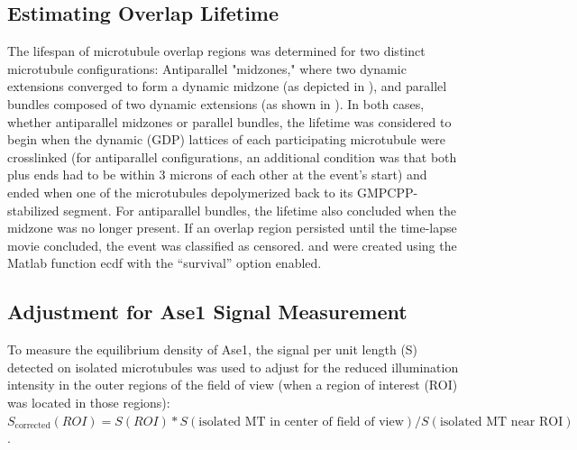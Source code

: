 \subsection{Estimating Overlap Lifetime}
The lifespan of microtubule overlap regions was determined for two distinct microtubule configurations: Antiparallel "midzones," where two dynamic extensions converged to form a dynamic midzone (as depicted in ), and parallel bundles composed of two dynamic extensions (as shown in ). In both cases, whether antiparallel midzones or parallel bundles, the lifetime was considered to begin when the dynamic (GDP) lattices of each participating microtubule were crosslinked (for antiparallel configurations, an additional condition was that both plus ends had to be within 3 microns of each other at the event's start) and ended when one of the microtubules depolymerized back to its GMPCPP-stabilized segment. For antiparallel bundles, the lifetime also concluded when the midzone was no longer present. If an overlap region persisted until the time-lapse movie concluded, the event was classified as censored.  and  were created using the Matlab function ecdf with the “survival” option enabled.

\subsection{Adjustment for Ase1 Signal Measurement}
To measure the equilibrium density of Ase1, the signal per unit length (S) detected on isolated microtubules was used to adjust for the reduced illumination intensity in the outer regions of the field of view (when a region of interest (ROI) was located in those regions): $S_{\textrm{corrected}}(ROI) = S(ROI) * S(\textrm{isolated MT in center of field of view}) / S(\textrm{isolated MT near ROI})$.

